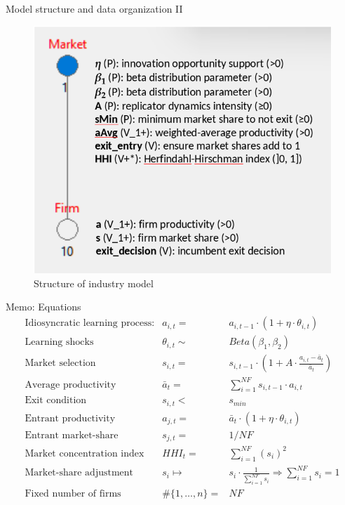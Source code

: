 \documentclass[bigger,aspectratio=169]{beamer}
\begin{document}
\begin{frame}[label={sec:orgfa0192f}]{Model structure and data organization II}
\begin{figure}[htbp]
\centering
\includegraphics[clip,trim=0 0 0 0,width=.8\textwidth,height=.75\textheight]{figs/Structure_Industry_LSD.png}
\caption{Structure of industry model}
\end{figure}
\end{frame}
\begin{frame}[label={sec:orgf012881}]{Memo: Equations}
\[ \begin{array}{lrl}
\mbox{Idiosyncratic learning process:} & a_{i,t} = &a_{i,t-1}\cdot (1 + \eta\cdot\theta_{i,t})\\
\mbox{Learning shocks} & \theta_{i,t} \sim  & Beta(\beta_1, \beta_2)\\
\mbox{Market selection} & s_{i,t} =  & s_{i,t-1} \cdot \left( 1 + A\cdot\frac{a_{i,t} - \bar{a}_{t}}{\bar{a}_{t}}\right) \\
\mbox{Average productivity} & \bar{a}_{t} =  & \sum_{i=1}^{NF} s_{i, t-1}\cdot a_{i,t} \\
\mbox{Exit condition} & s_{i,t} < & s_{min}\\
\mbox{Entrant productivity} & a_{j,t} =&  \bar{a}_{t}\cdot (1 + \eta\cdot\theta_{i,t})\\
\mbox{Entrant market-share} & s_{j,t} =& 1/NF \\
\mbox{Market concentration index} & HHI_{t} =& \sum_{i=1}^{NF} (s_{i})^2 \\
\mbox{Market-share adjustment} &  s_{i} \mapsto & s_{i}\cdot \frac{1}{\sum_{i=1}^{NF} s_{i}} \Rightarrow \sum_{i=1}^{NF} s_{i} = 1 \\
\mbox{Fixed number of firms} & \#\{1, \ldots, n\} =& NF
\end{array}\]
\end{frame}
\end{document}
